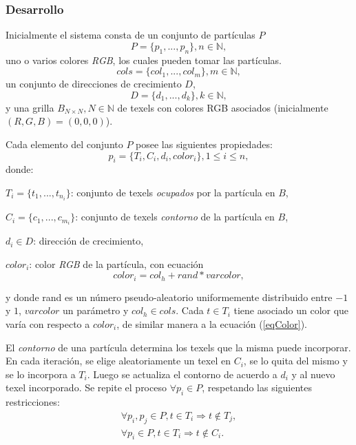 \documentclass[spanish,a4paper,openright,11pt]{book}
\begin{document}
\subsubsection{Desarrollo}
Inicialmente el sistema consta de un conjunto de part\'iculas $P$
\begin{equation}
P = \{p_{1}, ... , p_{n}\}, n  \in \mathbb{N},
\end{equation}
uno o varios colores {\em RGB}, los cuales pueden tomar las part\'iculas.
\begin{equation}
cols = \{col_{1}, ... , col_{m} \}, m \in \mathbb{N},
\end{equation}
un conjunto de direcciones de crecimiento $D$,
\begin{equation}
D = \{d_{1}, ... , d_{k} \}, k \in \mathbb{N},
\end{equation}
y una grilla $B_{N\times N}, N \in \mathbb{N} $ de texels con colores RGB asociados (inicialmente $(R,G,B)=(0,0,0)$).

Cada elemento del conjunto $P$ posee las siguientes propiedades:
\begin{equation}
p_{i} = \{T_{i}, C_{i}, d_{i}, color_{i}\}, 1 \le i \le n,
\end{equation}
donde:

$T_{i} = \{t_{1}, ... , t_{n_{i}}\}$: conjunto de texels {\em ocupados} por la part\'icula en $B$,

$C_{i} = \{c_{1}, ... , c_{m_{i}}\}$: conjunto de texels {\em contorno} de la part\'icula en $B$,

$d_{i} \in D$: direcci\'on de crecimiento,

$color_{i}$: color {\em RGB} de la part\'icula, con ecuaci\'on \cite{Reeves83}
\begin{equation}
color_{i} = col_{h} + rand * varcolor,
\label{eqColor}
\end{equation}

\noindent
y donde rand es un n\'umero pseudo-aleatorio uniformemente distribuido entre $-1$ y $1$, $varcolor$ un par\'ametro y $col_{h} \in cols$.
Cada $t \in T_{i}$ tiene asociado un color que var\'ia con respecto a $color_{i}$, de similar manera a la ecuaci\'on (\ref{eqColor}).

El {\em contorno} de una part\'icula determina los texels que la misma puede incorporar. 
En cada iteraci\'on, se elige aleatoriamente un texel en $C_{i}$, se lo quita del mismo y se lo incorpora a $T_{i}$.
Luego se actualiza el contorno de acuerdo a $d_{i}$ y al nuevo texel incorporado.
Se repite el proceso $\forall p_{i} \in P$, respetando las siguientes restricciones:
\begin{eqnarray}
\forall p_{i}, p_{j} \in P, t \in T_{i} \Rightarrow t \notin T_{j}, \\
\forall p_{i} \in P, t \in T_{i} \Rightarrow t \notin C_{i}.
\end{eqnarray}
\end{document}
